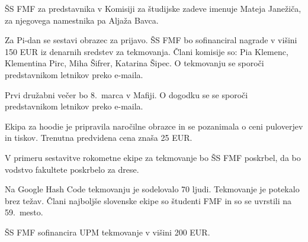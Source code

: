 \documentclass{seja}
\begin{document}
\begin{ad}
	\item
	\begin{sklep*}
	ŠS FMF za predstavnika v Komisiji za študijske zadeve imenuje Mateja Janežiča, za njegovega namestnika pa Aljaža Bavca.
	\end{sklep*}
	
	\item 
	Za Pi-dan se sestavi obrazec za prijavo. ŠS FMF bo sofinanciral nagrade v višini 150 EUR iz denarnih sredstev za tekmovanja.
	Člani komisije so:
	Pia Klemenc, Klementina Pirc, Miha Šifrer, Katarina Šipec.
	O tekmovanju se sporoči predstavnikom letnikov preko e-maila.
	
	\item	
	Prvi družabni večer bo 8.~marca v Mafiji. O dogodku se se sporoči predstavnikom letnikov preko e-maila.
	
	\item 
	Ekipa za hoodie je pripravila naročilne obrazce in se pozanimala o ceni puloverjev in tiskov. Trenutna predvidena cena znaša 25 EUR.
	
	\item 
	V primeru sestavitve rokometne ekipe za tekmovanje bo ŠS FMF poskrbel, da bo vodstvo fakultete poskrbelo za drese.
	
	\item
	Na Google Hash Code tekmovanju je sodelovalo 70 ljudi. Tekmovanje je potekalo brez težav. Člani najboljše slovenske ekipe so študenti FMF in so se uvrstili na 59.~mesto.
	
	\item
	ŠS FMF sofinancira UPM tekmovanje v višini 200 EUR.
	
\end{ad}

\makeatletter \global\let\@enddocumenthook\@empty \makeatother
{}
\end{document}
